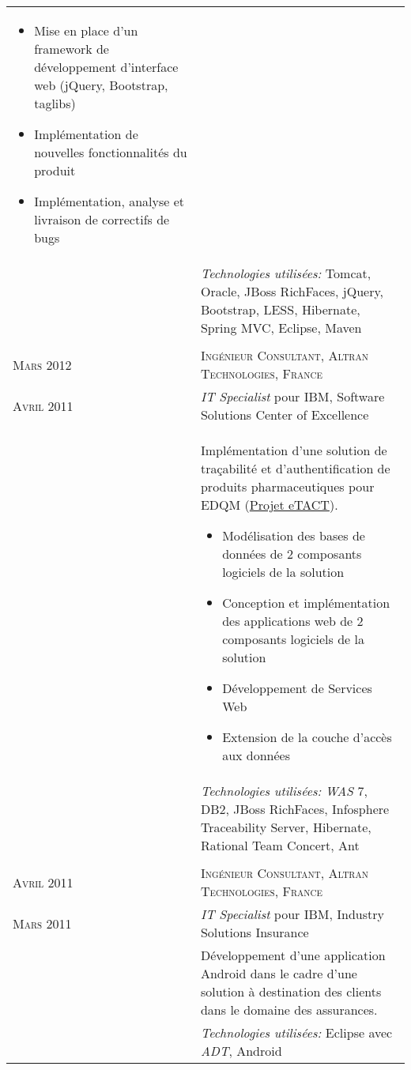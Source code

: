 \begin{longtable}{R{2.5cm}|p{14.8cm}}
{\begin{itemize}
      \item Mise en place d'un framework de développement d'interface web (jQuery, Bootstrap, taglibs)
      \item Implémentation de nouvelles fonctionnalités du produit
      \item Implémentation, analyse et livraison de correctifs de bugs
    \end{itemize}
    \vspace{-1em}
  }\\&
 	\footnotesize{\emph{Technologies utilisées:} Tomcat, Oracle, JBoss RichFaces, jQuery, Bootstrap, LESS, Hibernate, Spring MVC, Eclipse, Maven }\\
  \\
 	\textsc{Mars 2012} & \textsc{Ingénieur Consultant, Altran Technologies, France}\\
 	\textsc{Avril 2011}& \emph{IT Specialist} pour IBM, Software Solutions Center of Excellence\\&
 	\footnotesize{
 		Implémentation d'une solution de traçabilité et d'authentification
 	 	de produits pharmaceutiques pour EDQM (\href{https://www.edqm.eu/fr/eTACT-1466.html}{Projet eTACT}).
 		\begin{itemize}
			\item Modélisation des bases de données de 2 composants logiciels de la solution
			\item Conception et implémentation des applications web de 2 composants logiciels de la solution
			\item Développement de Services Web
			\item Extension de la couche d'accès aux données
		\end{itemize}
		\vspace{-1em}
	}\\&
 	\footnotesize{\emph{Technologies utilisées:} \emph{WAS} 7, DB2, JBoss RichFaces, Infosphere Traceability Server, Hibernate, Rational Team Concert, Ant}\\
  \\
 	\textsc{Avril 2011} & \textsc{Ingénieur Consultant, Altran Technologies, France}\\
 	\textsc{Mars 2011}& \emph{IT Specialist} pour IBM, Industry Solutions Insurance\\&
 	\footnotesize{Développement d'une application Android dans le cadre d'une solution à destination 
 	des clients dans le domaine des assurances.}\\&
 	\footnotesize{\emph{Technologies utilisées:} Eclipse avec \emph{ADT}, Android}\\

\end{longtable}
